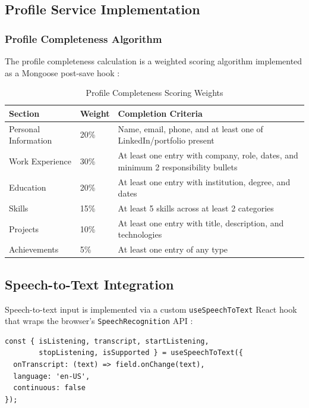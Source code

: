 \documentclass[12pt, a4paper, oneside]{report}
\begin{document}
\subsection{Profile Service Implementation}

\subsubsection{Profile Completeness Algorithm}

The profile completeness calculation is a weighted scoring algorithm implemented as a Mongoose post-save hook \cite{mongoose2024}:

\begin{table}[H]
\centering
\caption{Profile Completeness Scoring Weights}
\label{tab:completeness_weights}
\renewcommand{\arraystretch}{1.4}
\begin{tabularx}{\textwidth}{|p{4cm}|p{2cm}|X|}
\hline
\textbf{Section} & \textbf{Weight} & \textbf{Completion Criteria} \\
\hline
Personal Information & 20\% & Name, email, phone, and at least one of LinkedIn/portfolio present \\
\hline
Work Experience & 30\% & At least one entry with company, role, dates, and minimum 2 responsibility bullets \\
\hline
Education & 20\% & At least one entry with institution, degree, and dates \\
\hline
Skills & 15\% & At least 5 skills across at least 2 categories \\
\hline
Projects & 10\% & At least one entry with title, description, and technologies \\
\hline
Achievements & 5\% & At least one entry of any type \\
\hline
\end{tabularx}
\end{table}

\subsection{Speech-to-Text Integration}

Speech-to-text input is implemented via a custom \texttt{useSpeechToText} React hook that wraps the browser's \texttt{SpeechRecognition} API \cite{sears2003}:

\begin{verbatim}
const { isListening, transcript, startListening,
        stopListening, isSupported } = useSpeechToText({
  onTranscript: (text) => field.onChange(text),
  language: 'en-US',
  continuous: false
});
\end{verbatim}
\end{document}
